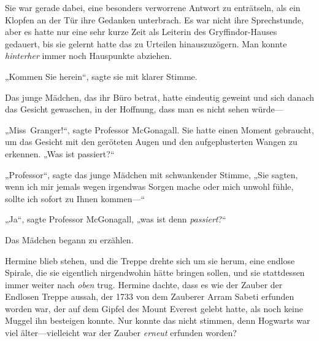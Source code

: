 Sie war gerade dabei, eine besonders verworrene Antwort zu enträtseln, als ein Klopfen an der Tür ihre Gedanken unterbrach. Es war nicht ihre Sprechstunde, aber es hatte nur eine sehr kurze Zeit als Leiterin des Gryffindor-Hauses gedauert, bis sie gelernt hatte das zu Urteilen hinauszuzögern. Man konnte \emph{hinterher} immer noch Hauspunkte abziehen.

„Kommen Sie herein“, sagte sie mit klarer Stimme.

Das junge Mädchen, das ihr Büro betrat, hatte eindeutig geweint und sich danach das Gesicht gewaschen, in der Hoffnung, dass man es nicht sehen würde—

„Miss~Granger!“, sagte Professor McGonagall. Sie hatte einen Moment gebraucht, um das Gesicht mit den geröteten Augen und den aufgeplusterten Wangen zu erkennen. „Was ist passiert?“

„Professor“, sagte das junge Mädchen mit schwankender Stimme, „Sie sagten, wenn ich mir jemals wegen irgendwas Sorgen mache oder mich unwohl fühle, sollte ich sofort zu Ihnen kommen—“

„Ja“, sagte Professor McGonagall, „was ist denn \emph{passiert}?“

Das Mädchen begann zu erzählen.

\later

Hermine blieb stehen, und die Treppe drehte sich um sie herum, eine endlose Spirale, die sie eigentlich nirgendwohin hätte bringen sollen, und sie stattdessen immer weiter nach \emph{oben} trug. Hermine dachte, dass es wie der Zauber der Endlosen Treppe aussah, der 1733 von dem Zauberer Arram Sabeti erfunden worden war, der auf dem Gipfel des Mount Everest gelebt hatte, als noch keine Muggel ihn besteigen konnte. Nur konnte das nicht stimmen, denn Hogwarts war viel älter—vielleicht war der Zauber \emph{erneut} erfunden worden?

